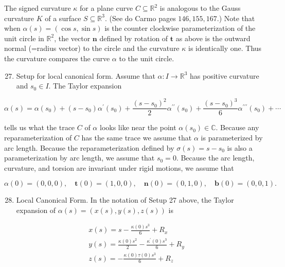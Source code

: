 \documentclass[10pt]{article}
\begin{document}
The signed curvature $\kappa$ for a plane curve $C \subseteq \mathbb{R}^{2}$ is analogous to the Gauss curvature $K$ of a surface $S \subseteq \mathbb{R}^{3}$. (See do Carmo pages $146,155,167$.) Note that when $\alpha(s)=(\cos s, \sin s)$ is the counter clockwise parameterization of the unit circle in $\mathbb{R}^{2}$, the vector $\mathbf{n}$ defined by rotation of $\mathbf{t}$ as above is the outward normal (=radius vector) to the circle and the curvature $\kappa$ is identically one. Thus the curvature compares the curve $\alpha$ to the unit circle.

\begin{enumerate}
  \setcounter{enumi}{26}
  \item Setup for local canonical form. Assume that $\alpha: I \rightarrow \mathbb{R}^{3}$ has positive curvature and $s_{0} \in I$. The Taylor expansion
\end{enumerate}

$$
\alpha(s)=\alpha\left(s_{0}\right)+\left(s-s_{0}\right) \alpha^{\prime}\left(s_{0}\right)+\frac{\left(s-s_{0}\right)^{2}}{2} \alpha^{\prime \prime}\left(s_{0}\right)+\frac{\left(s-s_{0}\right)^{3}}{6} \alpha^{\prime \prime \prime}\left(s_{0}\right)+\cdots
$$

tells us what the trace $C$ of $\alpha$ looks like near the point $\alpha\left(s_{0}\right) \in \mathbb{C}$. Because any reparameterization of $C$ has the same trace we assume that $\alpha$ is parameterized by arc length. Because the reparameterization defined by $\sigma(s)=s-s_{0}$ is also a parameterization by arc length, we assume that $s_{0}=0$. Because the arc length, curvature, and torsion are invariant under rigid motions, we assume that

$$
\alpha(0)=(0,0,0), \quad \mathbf{t}(0)=(1,0,0), \quad \mathbf{n}(0)=(0,1,0), \quad \mathbf{b}(0)=(0,0,1) .
$$

\begin{enumerate}
  \setcounter{enumi}{27}
  \item Local Canonical Form. In the notation of Setup 27 above, the Taylor expansion of $\alpha(s)=(x(s), y(s), z(s))$ is
\end{enumerate}

$$
\begin{aligned}
& x(s)=s-\frac{\kappa(0) s^{3}}{6}+R_{x} \\
& y(s)=\frac{\kappa(0) s^{2}}{2}-\frac{\kappa^{\prime}(0) s^{3}}{6}+R_{y} \\
& z(s)=-\frac{\kappa(0) \tau(0) s^{3}}{6}+R_{z}
\end{aligned}
$$
\end{document}
